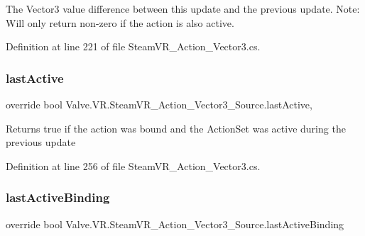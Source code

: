 The Vector3 value difference between this update and the previous update. Note\+: Will only return non-\/zero if the action is also active. 



Definition at line 221 of file Steam\+V\+R\+\_\+\+Action\+\_\+\+Vector3.\+cs.

\mbox{\label{class_valve_1_1_v_r_1_1_steam_v_r___action___vector3___source_a56ea7f665f4e5146e34432829375ec62}} 
\subsubsection{\texorpdfstring{lastActive}{lastActive}}
{\footnotesize\ttfamily override bool Valve.\+V\+R.\+Steam\+V\+R\+\_\+\+Action\+\_\+\+Vector3\+\_\+\+Source.\+last\+Active\hspace{0.3cm}{\ttfamily [get]}, {}}



Returns true if the action was bound and the Action\+Set was active during the previous update 



Definition at line 256 of file Steam\+V\+R\+\_\+\+Action\+\_\+\+Vector3.\+cs.

\mbox{\label{class_valve_1_1_v_r_1_1_steam_v_r___action___vector3___source_aa6005e20a2690c1c4cf84c20ac5e1409}} 
\subsubsection{\texorpdfstring{lastActiveBinding}{lastActiveBinding}}
{\footnotesize\ttfamily override bool Valve.\+V\+R.\+Steam\+V\+R\+\_\+\+Action\+\_\+\+Vector3\+\_\+\+Source.\+last\+Active\+Binding\hspace{0.3cm}{\ttfamily [get]}}



